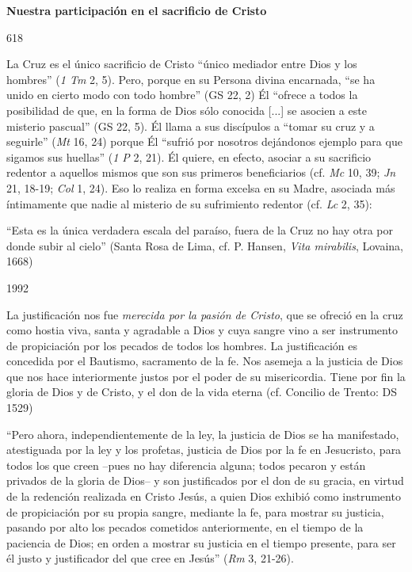 			\begin{ccebody}\textbf{Nuestra participación en el sacrificio de Cristo}\end{ccebody}
			
			\begin{ccebody}\begin{ccenumber}618\end{ccenumber} La Cruz es el único sacrificio de Cristo “único mediador entre Dios y los hombres” (\textit{1 Tm} 2, 5). Pero, porque en su Persona divina encarnada, “se ha unido en cierto modo con todo hombre” (GS 22, 2) Él “ofrece a todos la posibilidad de que, en la forma de Dios sólo conocida [...] se asocien a este misterio pascual” (GS 22, 5). Él llama a sus discípulos a “tomar su cruz y a seguirle” (\textit{Mt} 16, 24) porque Él “sufrió por nosotros dejándonos ejemplo para que sigamos sus huellas” (\textit{1 P} 2, 21). Él quiere, en efecto, asociar a su sacrificio redentor a aquellos mismos que son sus primeros beneficiarios (cf. \textit{Mc} 10, 39; \textit{Jn} 21, 18-19; \textit{Col} 1, 24). Eso lo realiza en forma excelsa en su Madre, asociada más íntimamente que nadie al misterio de su sufrimiento redentor (cf. \textit{Lc} 2, 35):\end{ccebody}
			
			\begin{ccecite}“Esta es la única verdadera escala del paraíso, fuera de la Cruz no hay otra por donde subir al cielo” (Santa Rosa de Lima, cf. P. Hansen, \textit{Vita mirabilis}, Lovaina, 1668)\end{ccecite}
			
			\begin{ccebody}\begin{ccenumber}1992\end{ccenumber} La justificación nos fue \textit{merecida por la pasión de Cristo}, que se ofreció en la cruz como hostia viva, santa y agradable a Dios y cuya sangre vino a ser instrumento de propiciación por los pecados de todos los hombres. La justificación es concedida por el Bautismo, sacramento de la fe. Nos asemeja a la justicia de Dios que nos hace interiormente justos por el poder de su misericordia. Tiene por fin la gloria de Dios y de Cristo, y el don de la vida eterna (cf. Concilio de Trento: DS 1529)\end{ccebody}
			
			\begin{ccecite}“Pero ahora, independientemente de la ley, la justicia de Dios se ha manifestado, atestiguada por la ley y los profetas, justicia de Dios por la fe en Jesucristo, para todos los que creen –pues no hay diferencia alguna; todos pecaron y están privados de la gloria de Dios– y son justificados por el don de su gracia, en virtud de la redención realizada en Cristo Jesús, a quien Dios exhibió como instrumento de propiciación por su propia sangre, mediante la fe, para mostrar su justicia, pasando por alto los pecados cometidos anteriormente, en el tiempo de la paciencia de Dios; en orden a mostrar su justicia en el tiempo presente, para ser él justo y justificador del que cree en Jesús” (\textit{Rm} 3, 21-26).\end{ccecite}
			
